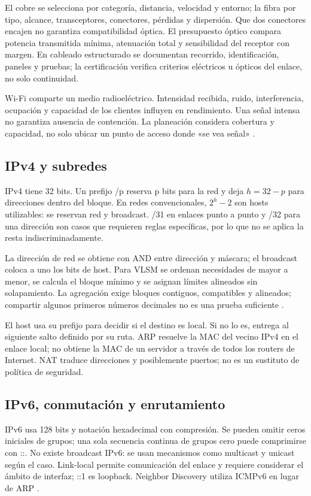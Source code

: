 El cobre se selecciona por categoría, distancia, velocidad y entorno; la fibra por tipo, alcance, transceptores, conectores, pérdidas y dispersión. Que dos conectores encajen no garantiza compatibilidad óptica. El presupuesto óptico compara potencia transmitida mínima, atenuación total y sensibilidad del receptor con margen. En cableado estructurado se documentan recorrido, identificación, paneles y pruebas; la certificación verifica criterios eléctricos u ópticos del enlace, no solo continuidad.

Wi-Fi comparte un medio radioeléctrico. Intensidad recibida, ruido, interferencia, ocupación y capacidad de los clientes influyen en rendimiento. Una señal intensa no garantiza ausencia de contención. La planeación considera cobertura y capacidad, no solo ubicar un punto de acceso donde «se vea señal» \cite{networks}.

\subsection{IPv4 y subredes}
IPv4 tiene 32 bits. Un prefijo /p reserva p bits para la red y deja $h=32-p$ para direcciones dentro del bloque. En redes convencionales, $2^h-2$ son hosts utilizables: se reservan red y broadcast. /31 en enlaces punto a punto y /32 para una dirección son casos que requieren reglas específicas, por lo que no se aplica la resta indiscriminadamente.

La dirección de red se obtiene con AND entre dirección y máscara; el broadcast coloca a uno los bits de host. Para VLSM se ordenan necesidades de mayor a menor, se calcula el bloque mínimo y se asignan límites alineados sin solapamiento. La agregación exige bloques contiguos, compatibles y alineados; compartir algunos primeros números decimales no es una prueba suficiente \cite[sección 3]{rfc4632}.

El host usa su prefijo para decidir si el destino es local. Si no lo es, entrega al siguiente salto definido por su ruta. ARP resuelve la MAC del vecino IPv4 en el enlace local; no obtiene la MAC de un servidor a través de todos los routers de Internet. NAT traduce direcciones y posiblemente puertos; no es un sustituto de política de seguridad.

\subsection{IPv6, conmutación y enrutamiento}
IPv6 usa 128 bits y notación hexadecimal con compresión. Se pueden omitir ceros iniciales de grupos; una sola secuencia continua de grupos cero puede comprimirse con ::. No existe broadcast IPv6: se usan mecanismos como multicast y unicast según el caso. Link-local permite comunicación del enlace y requiere considerar el ámbito de interfaz; ::1 es loopback. Neighbor Discovery utiliza ICMPv6 en lugar de ARP \cite[arquitectura de direcciones y descubrimiento de vecinos]{rfc4291,rfc4861}.

